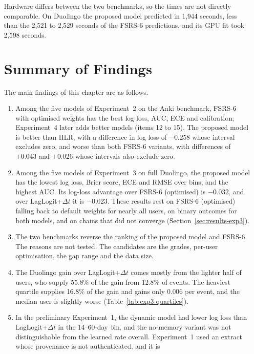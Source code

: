 Hardware differs between the two benchmarks, so the times are not directly comparable. On Duolingo the proposed model predicted in 1,944 seconds, less than the 2,521 to 2,529 seconds of the FSRS-6 predictions, and its GPU fit took 2,598 seconds.

\section{Summary of Findings}
\label{sec:results-summary}

The main findings of this chapter are as follows.

\begin{enumerate}
  \item Among the five models of Experiment~2 on the Anki benchmark, FSRS-6 with optimised weights has the best log loss, AUC, ECE and calibration; Experiment~4 later adds better models (items 12 to 15). The
    proposed model is better than HLR, with a difference in log loss of $-0.258$ whose interval excludes zero, and worse than both
    FSRS-6 variants, with differences of $+0.043$ and $+0.026$ whose intervals also exclude zero.
  \item Among the five models of Experiment~3 on full Duolingo, the proposed model has the lowest log loss, Brier score, ECE and RMSE over bins, and the
    highest AUC. Its log-loss advantage over FSRS-6 (optimised) is $-0.032$, and over LagLogit+$\Delta t$ it is $-0.023$. These results rest on FSRS-6 (optimised) falling back to default weights for nearly all users, on binary outcomes for both models, and on chains that did not converge (Section~\ref{sec:results-exp3}).
  \item The two benchmarks reverse the ranking of the proposed model and FSRS-6. The reasons are not tested. The candidates are the
    grades, per-user optimisation, the gap range and the data size.
  \item The Duolingo gain over LagLogit+$\Delta t$ comes mostly from the lighter half of users, who supply 55.8\% of the gain from 12.8\% of events. The heaviest quartile supplies 16.8\% of the gain and gains only 0.006 per event, and the median user is slightly worse (Table~\ref{tab:exp3-quartiles}).
  \item In the preliminary Experiment~1, the dynamic model had lower log loss than LagLogit+$\Delta t$ in the 14--60-day bin, and the no-memory variant was not
    distinguishable from the learned rate overall. Experiment~1 used an extract whose provenance is not authenticated, and it is

\end{enumerate}
